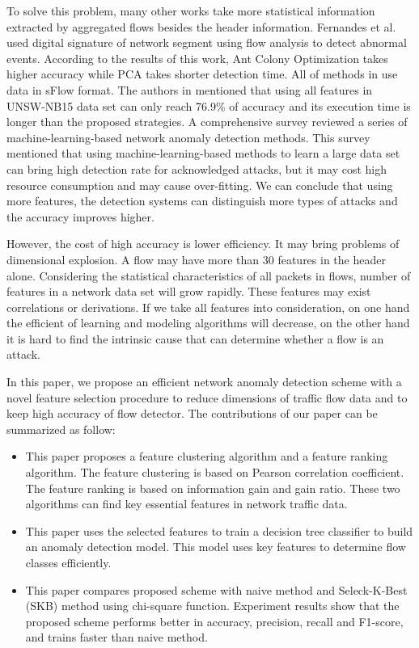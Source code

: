 \documentclass{ieeeaccess}
\theoremstyle{definition}
\begin{document}
To solve this problem, many other works take more statistical information extracted by aggregated flows besides the header information. Fernandes et al.\cite{Fernandes2015} used digital signature of network segment using flow analysis to detect abnormal events. According to the results of this work, Ant Colony Optimization takes higher accuracy while PCA takes shorter detection time. All of methods in \cite{Fernandes2015} use data in sFlow format. The authors in \cite{Anwer2018} mentioned that using all features in UNSW-NB15 data set \cite{UNSW-2015} can only reach 76.9\% of accuracy and its execution time is longer than the proposed strategies. A comprehensive survey \cite{Fernandes2019} reviewed a series of machine-learning-based network anomaly detection methods. This survey mentioned that using machine-learning-based methods to learn a large data set can bring high detection rate for acknowledged attacks, but it may cost high resource consumption and may cause over-fitting. We can conclude that using more features, the detection systems can distinguish more types of attacks and the accuracy improves higher.

However, the cost of high accuracy is lower efficiency. It may bring problems of dimensional explosion. A flow may have more than 30 features in the header alone. Considering the statistical characteristics of all packets in flows, number of features in a network data set will grow rapidly. These features may exist correlations or derivations. If we take all features into consideration, on one hand the efficient of learning and modeling algorithms will decrease, on the other hand it is hard to find the intrinsic cause that can determine whether a flow is an attack.

In this paper, we propose an efficient network anomaly detection scheme with a novel feature selection procedure to reduce dimensions of traffic flow data and to keep high accuracy of flow detector. The contributions of our paper can be summarized as follow:

\begin{itemize}
    \item This paper proposes a feature clustering algorithm and a feature ranking algorithm. The feature clustering is based on Pearson correlation coefficient. The feature ranking is based on information gain and gain ratio. These two algorithms can find key essential features in network traffic data.
    \item This paper uses the selected features to train a decision tree classifier to build an anomaly detection model. This model uses key features to determine flow classes efficiently. 
    \item This paper compares proposed scheme with naive method and Seleck-K-Best (SKB) method using chi-square function. Experiment results show that the proposed scheme performs better in accuracy, precision, recall and F1-score, and trains faster than naive method. 
\end{itemize}
\end{document}
